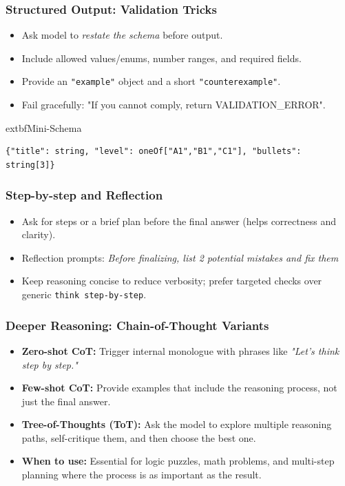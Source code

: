 \documentclass{beamer}
\begin{document}
\begin{frame}[fragile]
	\frametitle{Structured Output: Validation Tricks}
	\begin{itemize}
		\item Ask model to \textit{restate the schema} before output.
		\item Include allowed values/enums, number ranges, and required fields.
		\item Provide an \texttt{"example"} object and a short \texttt{"counterexample"}.
		\item Fail gracefully: "If you cannot comply, return VALIDATION\_ERROR".
	\end{itemize}
\vspace{0.2cm}
	extbf{Mini-Schema}
\begin{verbatim}
{"title": string, "level": oneOf["A1","B1","C1"], "bullets": string[3]}
\end{verbatim}
\end{frame}

\begin{frame}
	\frametitle{Step-by-step and Reflection}
	\begin{itemize}
		\item Ask for steps or a brief plan before the final answer (helps correctness and clarity).
	\item Reflection prompts: \textit{Before finalizing, list 2 potential mistakes and fix them}
	\item Keep reasoning concise to reduce verbosity; prefer targeted checks over generic \texttt{think step-by-step}.
	\end{itemize}
\end{frame}

\begin{frame}
	\frametitle{Deeper Reasoning: Chain-of-Thought Variants}
	\begin{itemize}
		\item \textbf{Zero-shot CoT:} Trigger internal monologue with phrases like \textit{"Let's think step by step."}
		\item \textbf{Few-shot CoT:} Provide examples that include the reasoning process, not just the final answer.
		\item \textbf{Tree-of-Thoughts (ToT):} Ask the model to explore multiple reasoning paths, self-critique them, and then choose the best one.
		\item \textbf{When to use:} Essential for logic puzzles, math problems, and multi-step planning where the process is as important as the result.
	\end{itemize}
\end{frame}
\end{document}
